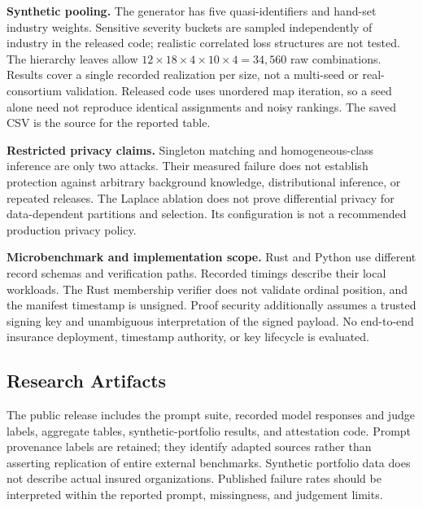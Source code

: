 \textbf{Synthetic pooling.} The generator has five quasi-identifiers and hand-set industry weights. Sensitive severity buckets are sampled independently of industry in the released code; realistic correlated loss structures are not tested. The hierarchy leaves allow $12\times18\times4\times10\times4=34{,}560$ raw combinations. Results cover a single recorded realization per size, not a multi-seed or real-consortium validation. Released code uses unordered map iteration, so a seed alone need not reproduce identical assignments and noisy rankings. The saved CSV is the source for the reported table.

\textbf{Restricted privacy claims.} Singleton matching and homogeneous-class inference are only two attacks. Their measured failure does not establish protection against arbitrary background knowledge, distributional inference, or repeated releases. The Laplace ablation does not prove differential privacy for data-dependent partitions and selection. Its configuration is not a recommended production privacy policy.

\textbf{Microbenchmark and implementation scope.} Rust and Python use different record schemas and verification paths. Recorded timings describe their local workloads. The Rust membership verifier does not validate ordinal position, and the manifest timestamp is unsigned. Proof security additionally assumes a trusted signing key and unambiguous interpretation of the signed payload. No end-to-end insurance deployment, timestamp authority, or key lifecycle is evaluated.

\subsection{Research Artifacts}
The public release includes the prompt suite, recorded model responses and judge labels, aggregate tables, synthetic-portfolio results, and attestation code. Prompt provenance labels are retained; they identify adapted sources rather than asserting replication of entire external benchmarks. Synthetic portfolio data does not describe actual insured organizations. Published failure rates should be interpreted within the reported prompt, missingness, and judgement limits.
